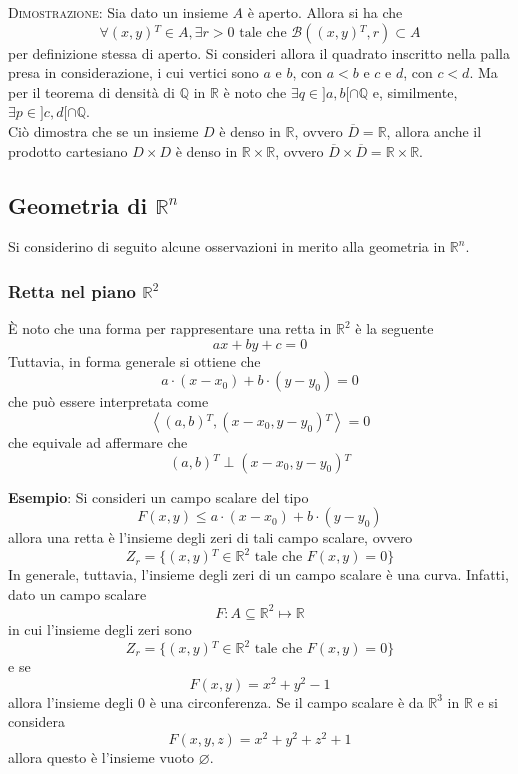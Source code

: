 \documentclass[a4paper]{extarticle}
\begin{document}
\vspace{2em}
\noindent
\normalfont \normalsize
\textsc{Dimostrazione}: Sia dato un insieme $A$ è aperto. Allora si ha che
\[\forall (x,y){^T} \in A, \exists r > 0 \text{ tale che } \mathcal{B}((x,y){^T}, r) \subset A\]
per definizione stessa di aperto. Si consideri allora il quadrato inscritto nella palla presa in considerazione, i cui vertici sono $a$ e $b$, con $a < b$ e $c$ e $d$, con $c < d$. Ma per il teorema di densità di $\mathbb{Q}$ in $\mathbb{R}$ è noto che $\exists q \in ]a,b[ \cap \mathbb{Q}$ e, similmente, $\exists p \in ]c,d[ \cap \mathbb{Q}$.\\
Ciò dimostra che se un insieme $D$ è denso in $\mathbb{R}$, ovvero $\overline{D} = \mathbb{R}$, allora anche il prodotto cartesiano $D \times D$ è denso in $\mathbb{R} \times \mathbb{R}$, ovvero $\overline{D} \times \overline{D} = \mathbb{R} \times \mathbb{R}$.

\vspace{1em}
\subsection{Geometria di $\mathbb{R}^n$}
Si considerino di seguito alcune osservazioni in merito alla geometria in $\mathbb{R}^n$.

\vspace{1em}
\subsubsection{Retta nel piano $\mathbb{R}^2$}
È noto che una forma per rappresentare una retta in $\mathbb{R}^2$ è la seguente
\[ax+by+c=0\]
Tuttavia, in forma generale si ottiene che
\[a \cdot (x-x_0) + b \cdot (y-y_0) = 0\]
che può essere interpretata come
\[\left<\left(a,b\right){^T},\left(x-x_0,y-y_0\right){^T}\right> = 0\]
che equivale ad affermare che
\[\left(a,b\right){^T} \perp \left(x-x_0,y-y_0\right){^T}\]

\vspace{1em}
\noindent
\textbf{Esempio}: Si consideri un campo scalare del tipo
\[F(x,y) \leq a \cdot (x-x_0) + b \cdot (y-y_0)\]
allora una retta è l'insieme degli zeri di tali campo scalare, ovvero
\[Z_r = \{(x,y){^T} \in \mathbb{R}^2 \text{ tale che } F(x,y) = 0\}\]
In generale, tuttavia, l'insieme degli zeri di un campo scalare è una curva. Infatti, dato un campo scalare
\[F : A \subseteq \mathbb{R}^2 \longmapsto \mathbb{R}\]
in cui l'insieme degli zeri sono 
\[Z_r = \{(x,y){^T} \in \mathbb{R}^2 \text{ tale che } F(x,y) = 0\}\]
e se
\[F(x,y) = x^2+y^2-1\]
allora l'insieme degli $0$ è una circonferenza. Se il campo scalare è da $\mathbb{R}^3$ in $\mathbb{R}$ e si considera
\[F(x,y,z) = x^2+y^2+z^2+1\]
allora questo è l'insieme vuoto $\varnothing$.
\end{document}
